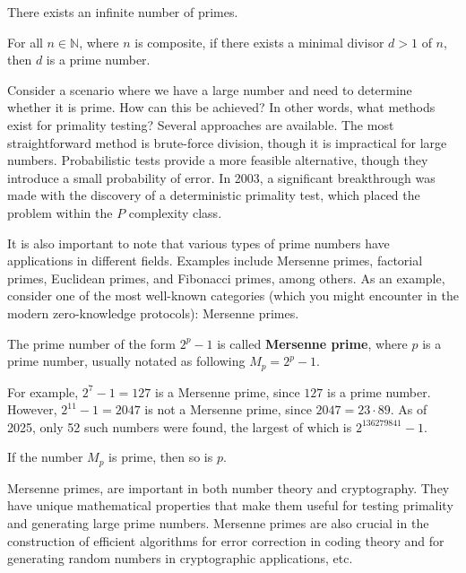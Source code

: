 \documentclass[../lecture-notes-148x210.tex]{subfiles}
\begin{document}
\begin{corollary}
    There exists an infinite number of primes.
\end{corollary}

\begin{lemma}
    For all $n \in \mathbb{N}$, where $n$ is composite, if there exists a 
    minimal divisor $d>1$ of $n$, then $d$ is a prime number.
\end{lemma}

Consider a scenario where we have a large number and need to determine whether
it is prime. How can this be achieved? In other words, what methods exist for
primality testing? Several approaches are available. The most straightforward
method is brute-force division, though it is impractical for large numbers.
Probabilistic tests provide a more feasible alternative, though they introduce a
small probability of error. In 2003, a significant breakthrough was made with
the discovery of a deterministic primality test, which placed the problem within
the $P$ complexity class.

It is also important to note that various types of prime numbers have
applications in different fields. Examples include Mersenne primes, factorial
primes, Euclidean primes, and Fibonacci primes, among others. As an example,
consider one of the most well-known categories (which you might encounter in the
modern zero-knowledge protocols): Mersenne primes.

\begin{definition}
    The prime number of the form $2^p - 1$ is called \textbf{Mersenne prime}, where $p$ is a
    prime number, usually notated as following $M_p = 2^p - 1$.
\end{definition}

\begin{example}
    For example, $2^7 - 1 = 127$ is a Mersenne prime, since $127$ is a prime number.
    However, $2^{11} - 1 = 2047$ is not a Mersenne prime, since $2047 = 23 \cdot 89$. 
    As of 2025, only 52 such numbers were found, the largest of which is $2^{136279841} - 1$.
\end{example}

\begin{lemma}
    If the number $M_p$ is prime, then so is $p$.
\end{lemma}

Mersenne primes, are important in both number theory and cryptography. They have
unique mathematical properties that make them useful for testing primality and
generating large prime numbers. Mersenne primes are also crucial in the
construction of efficient algorithms for error correction in coding theory and
for generating random numbers in cryptographic applications, etc. 
\end{document}

